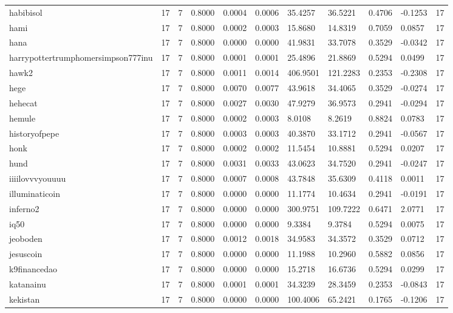 \begin{table}[htbp]
\begin{tabular}{lllllllllll}
habibisol & 17 & 7 & 0.8000 & 0.0004 & 0.0006 & 35.4257 & 36.5221 & 0.4706 & -0.1253 & 17 \\
hami & 17 & 7 & 0.8000 & 0.0002 & 0.0003 & 15.8680 & 14.8319 & 0.7059 & 0.0857 & 17 \\
hana & 17 & 7 & 0.8000 & 0.0000 & 0.0000 & 41.9831 & 33.7078 & 0.3529 & -0.0342 & 17 \\
harrypottertrumphomersimpson777inu & 17 & 7 & 0.8000 & 0.0001 & 0.0001 & 25.4896 & 21.8869 & 0.5294 & 0.0499 & 17 \\
hawk2 & 17 & 7 & 0.8000 & 0.0011 & 0.0014 & 406.9501 & 121.2283 & 0.2353 & -0.2308 & 17 \\
hege & 17 & 7 & 0.8000 & 0.0070 & 0.0077 & 43.9618 & 34.4065 & 0.3529 & -0.0274 & 17 \\
hehecat & 17 & 7 & 0.8000 & 0.0027 & 0.0030 & 47.9279 & 36.9573 & 0.2941 & -0.0294 & 17 \\
hemule & 17 & 7 & 0.8000 & 0.0002 & 0.0003 & 8.0108 & 8.2619 & 0.8824 & 0.0783 & 17 \\
historyofpepe & 17 & 7 & 0.8000 & 0.0003 & 0.0003 & 40.3870 & 33.1712 & 0.2941 & -0.0567 & 17 \\
honk & 17 & 7 & 0.8000 & 0.0002 & 0.0002 & 11.5454 & 10.8881 & 0.5294 & 0.0207 & 17 \\
hund & 17 & 7 & 0.8000 & 0.0031 & 0.0033 & 43.0623 & 34.7520 & 0.2941 & -0.0247 & 17 \\
iiiilovvvyouuuu & 17 & 7 & 0.8000 & 0.0007 & 0.0008 & 43.7848 & 35.6309 & 0.4118 & 0.0011 & 17 \\
illuminaticoin & 17 & 7 & 0.8000 & 0.0000 & 0.0000 & 11.1774 & 10.4634 & 0.2941 & -0.0191 & 17 \\
inferno2 & 17 & 7 & 0.8000 & 0.0000 & 0.0000 & 300.9751 & 109.7222 & 0.6471 & 2.0771 & 17 \\
iq50 & 17 & 7 & 0.8000 & 0.0000 & 0.0000 & 9.3384 & 9.3784 & 0.5294 & 0.0075 & 17 \\
jeoboden & 17 & 7 & 0.8000 & 0.0012 & 0.0018 & 34.9583 & 34.3572 & 0.3529 & 0.0712 & 17 \\
jesuscoin & 17 & 7 & 0.8000 & 0.0000 & 0.0000 & 11.1988 & 10.2960 & 0.5882 & 0.0856 & 17 \\
k9financedao & 17 & 7 & 0.8000 & 0.0000 & 0.0000 & 15.2718 & 16.6736 & 0.5294 & 0.0299 & 17 \\
katanainu & 17 & 7 & 0.8000 & 0.0001 & 0.0001 & 34.3239 & 28.3459 & 0.2353 & -0.0843 & 17 \\
kekistan & 17 & 7 & 0.8000 & 0.0000 & 0.0000 & 100.4006 & 65.2421 & 0.1765 & -0.1206 & 17 \\

\end{tabular}
\end{table}
